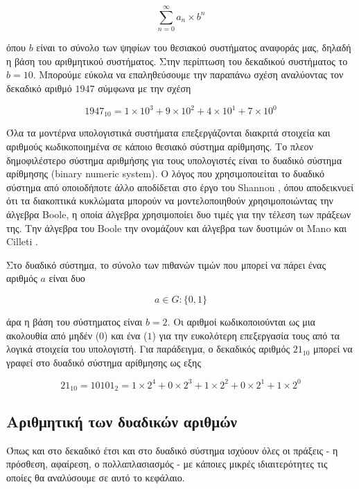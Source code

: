 \begin{equation}
    \sum_{n=0}^{\infty}a_n \times b^n
\end{equation}

όπου $b$ είναι το σύνολο των ψηφίων του θεσιακού συστήματος αναφοράς μας, δηλαδή η βάση του αριθμητικού συστήματος. Στην περίπτωση του δεκαδικού
συστήματος το $b = 10$. Μπορούμε εύκολα να επαληθεύσουμε την παραπάνω σχέση αναλύοντας τον δεκαδικό αριθμό $1947$ σύμφωνα με την σχέση

\begin{equation}
    1947_{10} = 1 \times 10^3 + 9 \times 10^2 + 4 \times 10^1 + 7 \times 10^0
\end{equation}

Όλα τα μοντέρνα υπολογιστικά συστήματα επεξεργάζονται διακριτά στοιχεία και αριθμούς κωδικοποιημένα σε κάποιο θεσιακό σύστημα αρίθμησης. Το πλεον
δημοφιλέστερο σύστημα αριθμήσης για τους υπολογιστές είναι το δυαδικό σύστημα αρίθμησης (binary numeric system). Ο λόγος που χρησιμοποιείται το
δυαδικό σύστημα από οποιοδήποτε άλλο αποδίδεται στο έργο του Shannon \cite{Shannon1940}, όπου αποδεικνυεί ότι τα διακοπτικά κυκλώματα μπορούν 
να μοντελοποιηθούν χρησιμοποιώντας την άλγεβρα Boole, η οποία άλγεβρα χρησιμοποίει δυο τιμές για την τέλεση των πράξεων της. Την άλγεβρα του Boole
την ονομάζουν και άλγεβρα των δυοτιμών οι Mano και Cilleti \cite{ManoCilleti2018}.

Στο δυαδικό σύστημα, το σύνολο των πιθανών τιμών που μπορεί να πάρει ένας αριθμός $a$ είναι δυο

\begin{equation}
    a \in G: \{0, 1\}
\end{equation}

άρα η βάση του σύστηματος είναι $b = 2$. Οι αριθμοί κωδικοποιούνται ως μια ακολουθία από μηδέν ($0$) και ένα ($1$) για την ευκολότερη επεξεργασία
τους από τα λογικά στοιχεία του υπολογιστή. Για παράδειγμα, ο δεκαδικός αριθμός $21_{10}$ μπορεί να γραφεί στο δυαδικό σύστημα αρίθμησης ως εξης

\begin{equation}
    21_{10} = 10101_2 = 1 \times 2^4 + 0 \times 2^3 + 1 \times 2^2 + 0 \times 2^1 + 1 \times 2^0 
\end{equation}

\subsection{Αριθμητική των δυαδικών αριθμών}

Όπως και στο δεκαδικό έτσι και στο δυαδικό σύστημα ισχύουν όλες οι πράξεις - η πρόσθεση, αφαίρεση, ο πολλαπλασιασμός - με κάποιες μικρές
ιδιαιτερότητες τις οποίες θα αναλύσουμε σε αυτό το κεφάλαιο.

